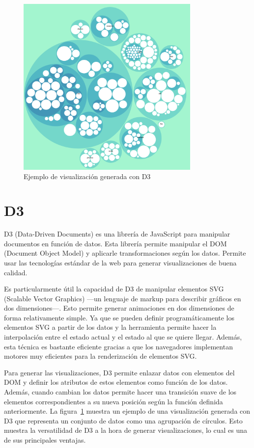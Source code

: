 \begin{figure}[H]
    \centering
    \includegraphics[width=0.8\textwidth]{imagenes/d3/ejemplo.png}
    \caption{Ejemplo de visualización generada con D3}
    \label{fig:d3-ejemplo}
\end{figure}

\section{D3}

D3 (Data-Driven Documents) es una librería de JavaScript para manipular documentos en función de datos. Esta librería permite manipular el DOM (Document Object Model) y aplicarle transformaciones según los datos. Permite usar las tecnologías estándar de la web para generar visualizaciones de buena calidad.

Es particularmente útil la capacidad de D3 de manipular elementos SVG (Scalable Vector Graphics) ---un lenguaje de markup para describir gráficos en dos dimensiones---. Esto permite generar animaciones en dos dimensiones de forma relativamente simple. Ya que se pueden definir programáticamente los elementos SVG a partir de los datos y la herramienta permite hacer la interpolación entre el estado actual y el estado al que se quiere llegar. Además, esta técnica es bastante eficiente gracias a que los navegadores implementan motores muy eficientes para la renderización de elementos SVG.

Para generar las visualizaciones, D3 permite enlazar datos con elementos del DOM y definir los atributos de estos elementos como función de los datos. Además, cuando cambian los datos permite hacer una transición suave de los elementos correspondientes a su nueva posición según la función definida anteriormente. La figura~\ref{fig:d3-ejemplo} muestra un ejemplo de una visualización generada con D3 que representa un conjunto de datos como una agrupación de círculos. Esto muestra la versatilidad de D3 a la hora de generar visualizaciones, lo cual es una de sus principales ventajas.

